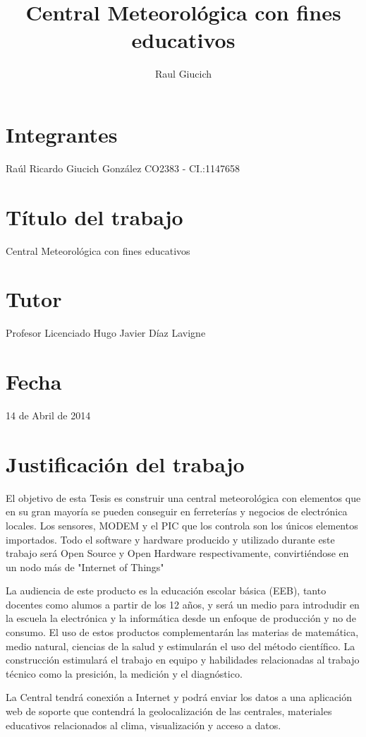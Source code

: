 \documentclass[a4paper,11pt, spanish]{article}
\title{Central Meteorológica con fines educativos}
\author{Raul Giucich}
\begin{document}
\section{Integrantes}
Raúl Ricardo Giucich González
CO2383 - CI.:1147658

\section{Título del trabajo}
Central Meteorológica con fines educativos

\section{Tutor}
Profesor Licenciado Hugo Javier Díaz Lavigne

\section{Fecha}
14 de Abril de 2014

\section{Justificación del trabajo}
El objetivo de esta Tesis es construir una central meteorológica con elementos que en su gran mayoría se pueden conseguir en ferreterías y negocios de electrónica locales. Los sensores, MODEM y el PIC que los controla son los únicos elementos importados. Todo el software y hardware producido y utilizado durante este trabajo será Open Source y Open Hardware respectivamente, convirtiéndose en un nodo más de "Internet of Things"

La audiencia de este producto es la educación escolar básica (EEB), tanto docentes como alumos a partir de los 12 años, y será un medio para introdudir en la escuela la electrónica y la informática desde un enfoque de producción y no de consumo. El uso de estos productos complementarán las materias de matemática, medio natural, ciencias de la salud y estimularán el uso del método científico. La construcción estimulará el trabajo en equipo y habilidades relacionadas al trabajo técnico como la presición, la medición y el diagnóstico.

La Central tendrá conexión a Internet y podrá enviar los datos a una aplicación web de soporte que contendrá la geolocalización de las centrales, materiales educativos relacionados al clima, visualización y acceso a datos.
\end{document}
